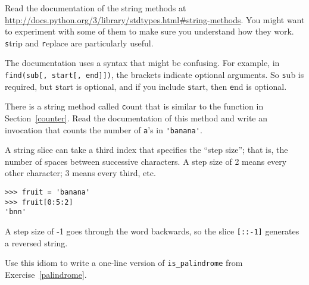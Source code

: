 \documentclass[
DIV=11,
fontsize=12,
twoside,
headinclude=false,
titlepage=firstiscover,
abstract=true,
headsepline=true,
footsepline=true,
chapterprefix=true, %
headings=big,
bibliography=totoc,%
captions=tableheading
]{scrbook}
\theoremstyle{definition}
\begin{document}
\begin{exercise}
\normalfont
{}

Read the documentation of the string methods at
\url{http://docs.python.org/3/library/stdtypes.html#string-methods}.
You might want to experiment with some of them to make sure you
understand how they work.  {\texttt strip} and {\texttt replace} are
particularly useful.

The documentation uses a syntax that might be confusing.
For example, in \verb"find(sub[, start[, end]])", the brackets
indicate optional arguments.  So {\texttt sub} is required, but
{\texttt start} is optional, and if you include {\texttt start},
then {\texttt end} is optional.

\end{exercise}


\begin{exercise}
\normalfont
{}

There is a string method called {\texttt count} that is similar
to the function in Section~\ref{counter}.  Read the documentation
of this method
and write an invocation that counts the number of {\texttt a}'s
in \verb"'banana'".
\end{exercise}


\begin{exercise}
\normalfont
{}

A string slice can take a third index that specifies the ``step
size''; that is, the number of spaces between successive characters.
A step size of 2 means every other character; 3 means every third,
etc.

\begin{lstlisting}
>>> fruit = 'banana'
>>> fruit[0:5:2]
'bnn'
\end{lstlisting}

A step size of -1 goes through the word backwards, so
the slice \verb"[::-1]" generates a reversed string.

Use this idiom to write a one-line version of \verb"is_palindrome"
from Exercise~\ref{palindrome}.
\end{exercise}
\end{document}
